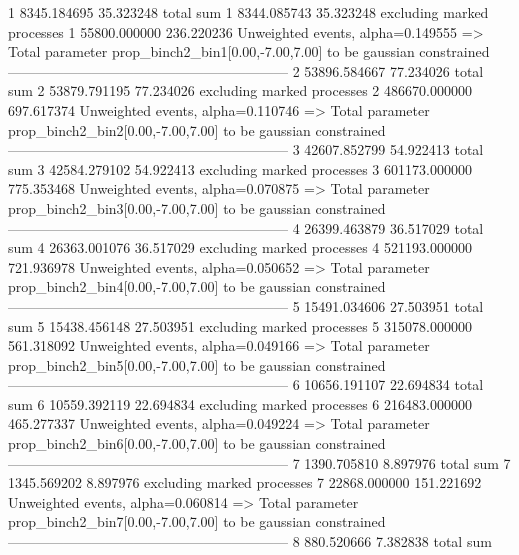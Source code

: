 1          8345.184695     35.323248       total sum                     
1          8344.085743     35.323248       excluding marked processes    
1          55800.000000    236.220236      Unweighted events, alpha=0.149555
  => Total parameter prop_binch2_bin1[0.00,-7.00,7.00] to be gaussian constrained
------------------------------------------------------------
2          53896.584667    77.234026       total sum                     
2          53879.791195    77.234026       excluding marked processes    
2          486670.000000   697.617374      Unweighted events, alpha=0.110746
  => Total parameter prop_binch2_bin2[0.00,-7.00,7.00] to be gaussian constrained
------------------------------------------------------------
3          42607.852799    54.922413       total sum                     
3          42584.279102    54.922413       excluding marked processes    
3          601173.000000   775.353468      Unweighted events, alpha=0.070875
  => Total parameter prop_binch2_bin3[0.00,-7.00,7.00] to be gaussian constrained
------------------------------------------------------------
4          26399.463879    36.517029       total sum                     
4          26363.001076    36.517029       excluding marked processes    
4          521193.000000   721.936978      Unweighted events, alpha=0.050652
  => Total parameter prop_binch2_bin4[0.00,-7.00,7.00] to be gaussian constrained
------------------------------------------------------------
5          15491.034606    27.503951       total sum                     
5          15438.456148    27.503951       excluding marked processes    
5          315078.000000   561.318092      Unweighted events, alpha=0.049166
  => Total parameter prop_binch2_bin5[0.00,-7.00,7.00] to be gaussian constrained
------------------------------------------------------------
6          10656.191107    22.694834       total sum                     
6          10559.392119    22.694834       excluding marked processes    
6          216483.000000   465.277337      Unweighted events, alpha=0.049224
  => Total parameter prop_binch2_bin6[0.00,-7.00,7.00] to be gaussian constrained
------------------------------------------------------------
7          1390.705810     8.897976        total sum                     
7          1345.569202     8.897976        excluding marked processes    
7          22868.000000    151.221692      Unweighted events, alpha=0.060814
  => Total parameter prop_binch2_bin7[0.00,-7.00,7.00] to be gaussian constrained
------------------------------------------------------------
8          880.520666      7.382838        total sum                     
